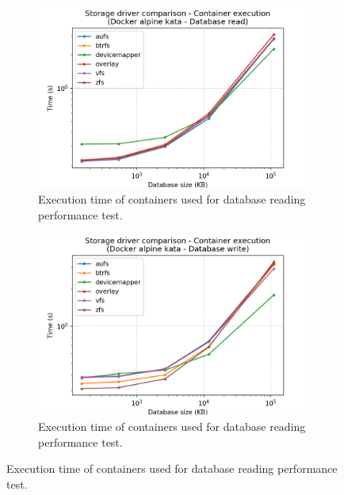 \begin{figure}[h!]
    \begin{subfigure}{.5\textwidth}
      \centering
      \includegraphics[width=\linewidth]{images/storage-driver/storage-driver-execution-Docker-alpine-kata---Database-read.png}
      \caption{Execution time of containers used for database reading performance test.}
      \label{fig:storage-driver:kata:db-read-exec}
    \end{subfigure}
    \begin{subfigure}{.5\textwidth}
      \centering
      \includegraphics[width=\linewidth]{images/storage-driver/storage-driver-execution-Docker-alpine-kata---Database-write.png}
      \caption{Execution time of containers used for database reading performance test.}
      \label{fig:storage-driver:kata:db-write-exec}
    \end{subfigure}
    

\end{figure}
